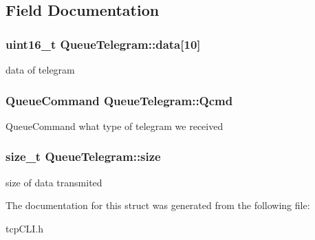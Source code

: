 \subsection{Field Documentation}
\hypertarget{struct_queue_telegram_a43b68c4a7f4cee5a8ff61cfe38efc716}{
\subsubsection[{data}]{\setlength{\rightskip}{0pt plus 5cm}uint16\+\_\+t Queue\+Telegram\+::data\mbox{[}10\mbox{]}}}\label{struct_queue_telegram_a43b68c4a7f4cee5a8ff61cfe38efc716}
data of telegram \hypertarget{struct_queue_telegram_a752eb6858a0e18355371dc6cdc559e64}{
\subsubsection[{Qcmd}]{\setlength{\rightskip}{0pt plus 5cm}Queue\+Command Queue\+Telegram\+::\+Qcmd}}\label{struct_queue_telegram_a752eb6858a0e18355371dc6cdc559e64}
Queue\+Command what type of telegram we received \hypertarget{struct_queue_telegram_a5adaf2ba7c2db4f8f198143783d09db3}{
\subsubsection[{size}]{\setlength{\rightskip}{0pt plus 5cm}size\+\_\+t Queue\+Telegram\+::size}}\label{struct_queue_telegram_a5adaf2ba7c2db4f8f198143783d09db3}
size of data transmited 

The documentation for this struct was generated from the following file\+:\begin{DoxyCompactItemize}
\item 
tcp\+C\+L\+I.\+h\end{DoxyCompactItemize}
